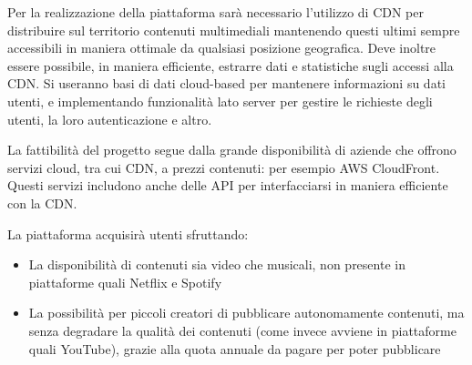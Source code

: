\begin{flushleft}
    {Per la realizzazione della piattaforma sarà necessario l'utilizzo di CDN per distribuire sul territorio contenuti multimediali mantenendo questi ultimi sempre accessibili in maniera ottimale da qualsiasi posizione geografica. Deve inoltre essere possibile, in maniera efficiente, estrarre dati e statistiche sugli accessi alla CDN. Si useranno basi di dati cloud-based per mantenere informazioni su dati utenti, e implementando funzionalità lato server per gestire le richieste degli utenti, la loro autenticazione e altro.}
\end{flushleft}

\begin{flushleft}
    {La fattibilità del progetto segue dalla grande disponibilità di aziende che offrono servizi cloud, tra cui CDN, a prezzi contenuti: per esempio AWS CloudFront. Questi servizi includono anche delle API per interfacciarsi in maniera efficiente con la CDN.}
\end{flushleft}

\begin{flushleft}
    {La piattaforma acquisirà utenti sfruttando:}
    
    \begin{itemize}
        \item {La disponibilità di contenuti sia video che musicali, non presente in piattaforme quali Netflix e Spotify}
        
        \item {La possibilità per piccoli creatori di pubblicare autonomamente contenuti, ma senza degradare la qualità dei contenuti (come invece avviene in piattaforme quali YouTube), grazie alla quota annuale da pagare per poter pubblicare}
    \end{itemize}
\end{flushleft}